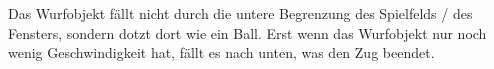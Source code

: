 Das Wurfobjekt fällt nicht durch die untere Begrenzung des Spielfelds / des Fensters, sondern dotzt dort wie ein Ball. Erst wenn das Wurfobjekt nur noch wenig Geschwindigkeit hat, fällt es nach unten, was den Zug beendet.